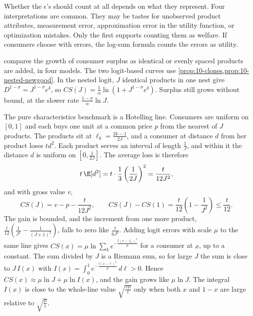 Whether the $\epsilon$'s should count at all depends on what they represent. Four interpretations are common. They
may be tastes for unobserved product attributes, measurement error, approximation error in the utility function,
or optimization mistakes. Only the first supports counting them as welfare. If consumers choose with errors, the
log-sum formula counts the errors as utility.

  compares the growth of consumer surplus as
identical or evenly spaced products are added, in four models. The two logit-based curves use
\cref{prop:10-clones,prop:10-nested-newgood}. In the nested logit, $J$ identical products in one nest give
$D^{1-\sigma} = J^{1-\sigma}e^{\delta}$, so $CS(J) = \frac{1}{\alpha}\ln(1 + J^{1-\sigma}e^{\delta})$. Surplus still
grows without bound, at the slower rate $\frac{1-\sigma}{\alpha}\ln J$.

The pure characteristics benchmark is a Hotelling line. Consumers are uniform on $[0,1]$ and each buys one unit
at a common price $p$ from the nearest of $J$ products. The products sit at $\ell_k = \frac{2k-1}{2J}$, and a
consumer at distance $d$ from her product loses $td^2$. Each product serves an interval of length $\frac{1}{J}$,
and within it the distance $d$ is uniform on $\left[0,\frac{1}{2J}\right]$. The average loss is therefore
\begin{equation*}
t\,\E[d^2] = t\cdot\frac{1}{3}\left(\frac{1}{2J}\right)^2 = \frac{t}{12J^2},
\end{equation*}
and with gross value $v$,
\begin{equation}\label{eq:10-hotelling-cs}
CS(J) = v - p - \frac{t}{12J^2},
\qquad
CS(J) - CS(1) = \frac{t}{12}\left(1 - \frac{1}{J^2}\right) \le \frac{t}{12}.
\end{equation}
The gain is bounded, and the increment from one more product, $\frac{t}{12}\left(\frac{1}{J^2} -
\frac{1}{(J+1)^2}\right)$, falls to zero like $\frac{t}{6J^3}$. Adding logit errors with scale $\mu$ to the same
line gives $CS(x) = \mu\ln\sum_k e^{-\frac{t(x - \ell_k)^2}{\mu}}$ for a consumer at $x$, up to a constant. The
sum divided by $J$ is a Riemann sum, so for large $J$ the sum is close to
$J\,I(x)$ with $I(x) = \int_0^1 e^{-\frac{t(x - \ell)^2}{\mu}}\,d\ell > 0$. Hence $CS(x) \approx \mu\ln J + \mu\ln I(x)$,
and the gain grows like $\mu\ln J$. The integral $I(x)$ is close to the whole-line value $\sqrt{\frac{\pi\mu}{t}}$
only when both $x$ and $1 - x$ are large relative to $\sqrt{\frac{\mu}{t}}$.

